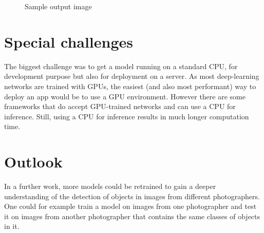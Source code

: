 \documentclass[a4paper,10pt,hidelinks]{scrartcl}
\begin{document}
\begin{figure}[!h]
	\caption{\label{fig:tidy-image} Sample output image}
\end{figure}

\section{\fontsize{14}{16}\selectfont Special challenges}

The biggest challenge was to get a model running on a standard CPU, for development purpose but also for deployment on a server. As most deep-learning networks are trained with GPUs, the easiest (and also most performant) way to deploy an app would be to use a GPU environment. However there are some frameworks that do accept GPU-trained networks and can use a CPU for inference. Still, using a CPU for inference results in much longer computation time.

\section{\fontsize{14}{16}\selectfont Outlook}


In a further work, more models could be retrained to gain a deeper understanding of the detection of objects in images from different photographers. One could for example train a model on images from one photographer and test it on images from another photographer that contains the same classes of objects in it.
\end{document}
